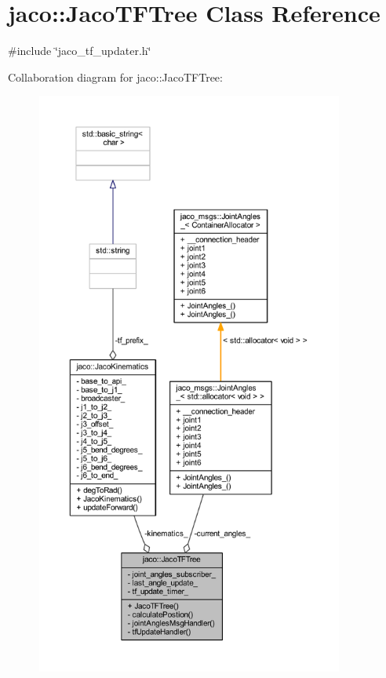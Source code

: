 \hypertarget{classjaco_1_1JacoTFTree}{}\section{jaco\+:\+:Jaco\+T\+F\+Tree Class Reference}
\label{classjaco_1_1JacoTFTree}


{\ttfamily \#include \char`\"{}jaco\+\_\+tf\+\_\+updater.\+h\char`\"{}}



Collaboration diagram for jaco\+:\+:Jaco\+T\+F\+Tree\+:
\nopagebreak
\begin{figure}[H]
\begin{center}
\leavevmode
\includegraphics[height=550pt]{d6/d82/classjaco_1_1JacoTFTree__coll__graph}
\end{center}
\end{figure}
